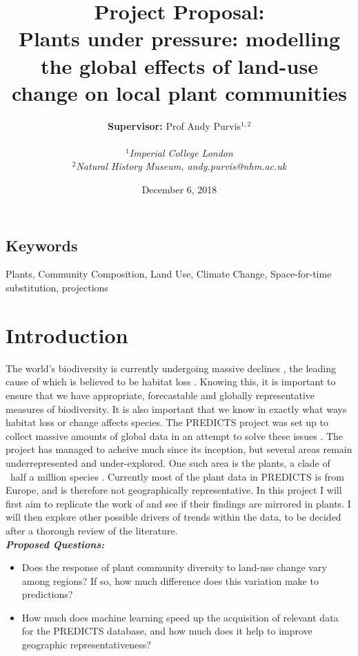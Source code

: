 \documentclass[11pt]{article}
\title{\textbf{Project Proposal:} \\Plants under pressure: modelling the global effects of land-use change on local plant communities}
\author{\Large\textbf{Supervisor:} Prof Andy Purvis$^{1,2}$\\\\\emph{$^1$Imperial College London}\\\emph{$^2$Natural History Museum, andy.purvis@nhm.ac.uk}}
\date{December 6, 2018}
\begin{document}
	
\begin{titlepage}
\Huge\maketitle
\end{titlepage}

\subsection{Keywords}
Plants, Community Composition, Land Use, Climate Change, Space-for-time substitution, projections

\section{Introduction}
The world's biodiversity is currently undergoing massive declines \citep{WWF2016}, the leading cause of which is believed to be habitat loss \citep{GlobalBiodiversityOutlook32010}. Knowing this, it is important to ensure that we have appropriate, forecastable and globally representative measures of biodiversity. It is also important that we know in exactly what ways habitat loss or change affects species. The PREDICTS project was set up to collect massive amounts of global data in an attempt to solve these issues \citep{Hudson2017}. The project has managed to acheive much since its inception, but several areas remain underrepresented and under-explored. One such area is the plants, a clade of ~half a million species \citep{ThePlantList2013}. Currently most of the plant data in PREDICTS is from Europe, and is therefore not geographically representative. In this project I will first aim to replicate the work of \citet{DePalma2016} and see if their findings are mirrored in plants. I will then explore other possible drivers of trends within the data, to be decided after a thorough review of the literature.\\
\emph{\textbf{Proposed Questions:}}
\begin{itemize}
	\item Does the response of plant community diversity to land-use change vary among regions? If so, how much difference does this variation make to predictions?
	\item How much does machine learning speed up the acquisition of relevant data for the PREDICTS database, and how much does it help to improve geographic representativeness?
\end{itemize}
\end{document}
